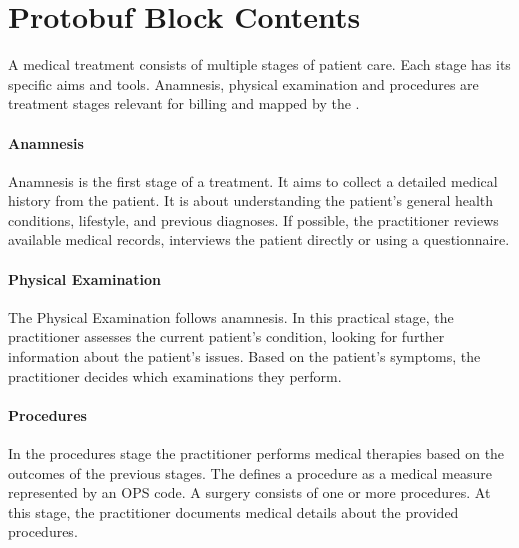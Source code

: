 \section{Protobuf Block Contents}\label{sec:protobuf-block-contents}

A medical treatment consists of multiple stages of patient care.
Each stage has its specific aims and tools.
Anamnesis, physical examination and procedures are treatment stages relevant for billing and mapped by the \AVS.

\paragraph{Anamnesis}
Anamnesis is the first stage of a treatment.
It aims to collect a detailed medical history from the patient\cite{lino2021medical}.
It is about understanding the patient's general health conditions,
lifestyle, and previous diagnoses.
If possible, the practitioner reviews available medical records,
interviews the patient directly or using a questionnaire\cite{zhang2011anamnevis}.

\paragraph{Physical Examination}
The Physical Examination follows anamnesis.
In this practical stage, the practitioner assesses the current patient's condition,
looking for further information about the patient's issues\cite{seidel2010mosby}.
Based on the patient's symptoms, the practitioner decides which examinations they perform.

\paragraph{Procedures}
In the procedures stage the practitioner performs medical therapies based on the outcomes of the previous stages.
The \AVS defines a procedure as a medical measure represented by an OPS code.
A surgery consists of one or more procedures.
At this stage, the practitioner documents medical details about the provided procedures.

